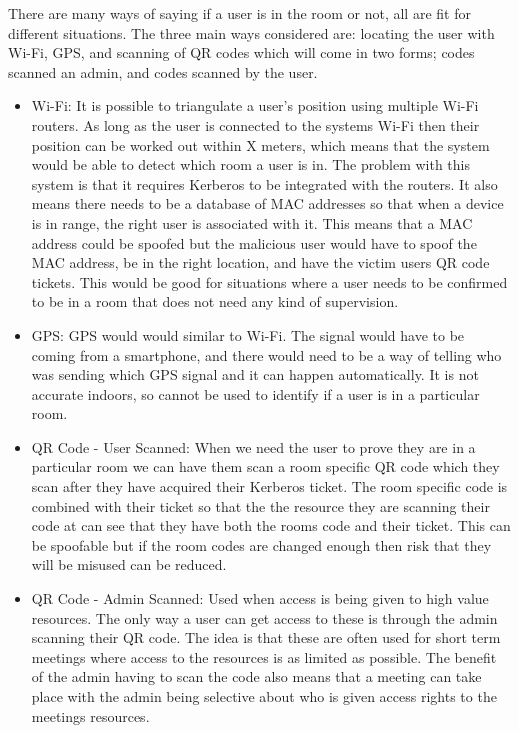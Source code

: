 \documentclass[]{report}   %
\begin{document}
There are many ways of saying if a user is in the room or not, all are fit for different situations. The three main ways considered are: locating the user with Wi-Fi, GPS, and scanning of QR codes which will come in two forms; codes scanned an admin, and codes scanned by the user.
\begin{itemize}

\item Wi-Fi: It is possible to triangulate a user’s position using multiple Wi-Fi routers. As long as the user is connected to the systems Wi-Fi then their position can be worked out within X meters, which means that the system would be able to detect which room a user is in. The problem with this system is that it requires Kerberos to be integrated with the routers. It also means there needs to be a database of MAC addresses so that when a device is in range, the right user is associated with it. This means that a MAC address could be spoofed but the malicious user would have to spoof the MAC address, be in the right location, and have the victim users QR code tickets. This would be good for situations where a user needs to be confirmed to be in a room that does not need any kind of supervision.

\item GPS: GPS would would similar to Wi-Fi. The signal would have to be coming from a smartphone, and there would need to be a way of telling who was sending which GPS signal and it can happen automatically. It is not accurate indoors, so cannot be used to identify if a user is in a particular room.

\item QR Code - User Scanned: When we need the user to prove they are in a particular room we can have them scan a room specific QR code which they scan after they have acquired their Kerberos ticket. The room specific code is combined with their ticket so that the the resource they are scanning their code at can see that they have both the rooms code and their ticket. This can be spoofable but if the room codes are changed enough then risk that they will be misused can be reduced.

\item QR Code - Admin Scanned: Used when access is being given to high value resources. The only way a user can get access to these is through the admin scanning their QR code. The idea is that these are often used for short term meetings where access to the resources is as limited as possible. The benefit of the admin having to scan the code also means that a meeting can take place with the admin being selective about who is given access rights to the meetings resources.

\end{itemize}
\end{document}
